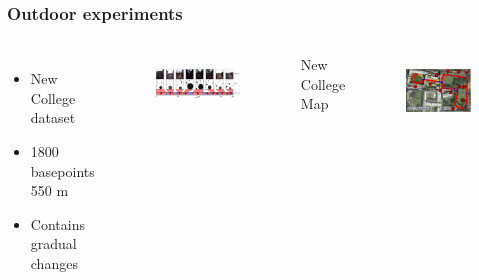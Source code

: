{
	\frametitle{Outdoor experiments}
	
	
	\begin{columns}[T]
		\begin{itemize}
			\item New College dataset
			\item 1800 basepoints 550 m
			\item Contains gradual changes
		\end{itemize}
		\centering
		\begin{figure}[p]
			\hspace{0.5cm}
			\includegraphics[width = 1\textwidth]{img/icsc/detected_places_nc}
			\label{fig:nc_ssg}
		\end{figure}

		\centering New College Map
		\begin{figure}[p]
			\centering
			\hspace{0.5cm}
			\includegraphics[width = 1.0\textwidth]{img/icsc/detected_places_nc_map}
			\label{fig:nc_map}
		\end{figure}
		

	\end{columns}		
	
}
\frame
